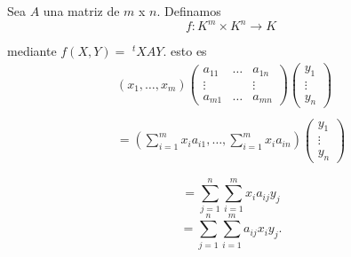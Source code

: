 		\begin{ejem}
			\normalfont
			Sea $ A $ una matriz de $ m $ x $ n $. Definamos
			\[ f:K^{m} \times K^{n} \rightarrow K \]
			
			mediante $ f(X,Y) =$ $^{t}XAY$. esto es
			\[ \begin{array}{c}
				\left(x_{1}, \ldots, x_{m}\right)\left(\begin{matrix}
				a_{11} &\ldots& a_{1n} \\ \vdots & &  \vdots \\ a_{m1} & \ldots & a_{mn}
				\end{matrix}\right)\left(\begin{array}{c}
					y_{1}\\ \vdots \\ y_{n}
				\end{array}\right)
				\\ \\
				= \left(\sum_{i=1}^{m}x_{i}a_{i1},\ldots,\sum_{i=1}^{m}x_{i}a_{in}\right) \left(\begin{array}{c}
				y_{1}\\ \vdots \\ y_{n}
				\end{array}\right)
			\end{array} \]
		
			\[  = \sum_{j=1}^{n} \sum_{i=1}^{m}x_{i}a_{ij}y_{j} \]
			 \[ = \sum_{j=1}^{n} \sum_{i=1}^{m}a_{ij}x_{i}y_{j}.  \]
			
		\end{ejem}